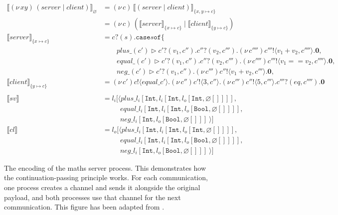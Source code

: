 \documentclass{l4proj}
\begin{document}
\begin{figure}[H]
\begin{align*}
\llbracket (\nu\,xy)\,(server \mid client) \rrbracket_{\varnothing} &= (\nu\,c)\,\llbracket( server \mid client) \rrbracket_{\{x,y \mapsto c\}} \\
&= (\nu\,c)\,(\llbracket server \rrbracket_{\{x \mapsto c\}} \mid \llbracket client \rrbracket_{\{y \mapsto c\}}) \\
\llbracket server \rrbracket_{\{x \mapsto c\}} &= c\texttt{?}(s).\texttt{case} s \texttt{of}\{ \\
& \qquad plus\_(c') \triangleright c'\texttt{?}(v_{1}, c'').c''\texttt{?}(v_{2}, c''').(\nu\,c'''')c'''\texttt{!}\langle v_{1} + v_{2}, c'''' \rangle.\textbf{0}, \\
& \qquad equal\_(c') \triangleright c'\texttt{?}(v_{1}, c'').c''\texttt{?}(v_{2}, c''').(\nu\,c'''')c'''\texttt{!}\langle v_{1} == v_{2}, c'''' \rangle.\textbf{0}, \\
& \qquad neg\_(c') \triangleright c'\texttt{?}(v_{1}, c'').(\nu\,c''')c''\texttt{!}\langle v_{1} + v_{2}, c''' \rangle.\textbf{0}, \\
\llbracket client \rrbracket_{\{y \mapsto c\}} &= (\nu\,c')c\texttt{!}\langle equal\_c' \rangle.(\nu\,c'')c'\texttt{!} \langle 3, c'' \rangle.(\nu\,c''')c''\texttt{!}\langle 5, c''' \rangle.c'''\texttt{?}(eq, c'''').\textbf{0} \\
{} \\
\llbracket sv \rrbracket &= l_{i}[\langle plus\_l_{i}[\texttt{Int}, l_{i}[\texttt{Int}, l_{o}[\texttt{Int}, \varnothing[]]]], \\
& \qquad \,\,\, equal\_l_{i}[\texttt{Int}, l_{i}[\texttt{Int}, l_{o}[\texttt{Bool}, \varnothing[]]]], \\
& \qquad \,\,\, neg\_l_{i}[\texttt{Int}, l_{o}[\texttt{Bool}, \varnothing[]]] \: \rangle] \\
\llbracket cl \rrbracket &= l_{o}[\langle plus\_l_{i}[\texttt{Int}, l_{i}[\texttt{Int}, l_{o}[\texttt{Int}, \varnothing[]]]], \\
& \qquad \,\,\, equal\_l_{i}[\texttt{Int}, l_{i}[\texttt{Int}, l_{o}[\texttt{Bool}, \varnothing[]]]], \\
& \qquad \,\,\, neg\_l_{i}[\texttt{Int}, l_{o}[\texttt{Bool}, \varnothing[]]] \: \rangle]
\end{align*}
\caption{The encoding of the maths server process. This demonstrates how the continuation-passing principle works. For each communication, one process creates a channel and sends it alongside the original payload, and both processes use that channel for the next communication. This figure has been adapted from \citet{DARDHA2017253}.}
\label{fig:exampleEnc}
\end{figure}
\end{document}
